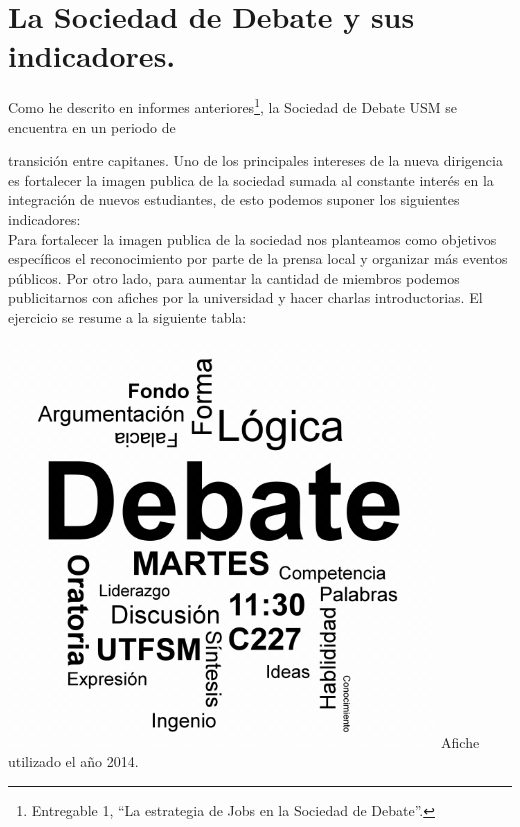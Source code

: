 \documentclass[spanish, fleqn]{article}
\begin{document}
	\section{La Sociedad de Debate y sus indicadores.}
	Como he descrito en informes anteriores\footnote{Entregable 1, ``La estrategia
	de Jobs en la Sociedad de Debate''.}, la Sociedad de Debate USM se encuentra 
	en un periodo de\\
	\begin{minipage}{0.75\textwidth}
	transición entre capitanes. Uno de los principales
	intereses de la nueva dirigencia es fortalecer la imagen publica de la sociedad
	sumada al constante interés en la integración de nuevos estudiantes, de esto
	podemos suponer los siguientes indicadores:\\
	Para fortalecer la imagen publica de la sociedad nos planteamos como objetivos
	específicos el reconocimiento por parte de la prensa local y organizar  más
	eventos públicos. Por otro lado, para aumentar la cantidad de miembros 
	podemos publicitarnos con afiches por la universidad y hacer charlas
	introductorias. El ejercicio se resume a la siguiente tabla:
	\end{minipage}
	\hfill
	\begin{minipage}{0.25\textwidth}
    	\begin{center}
    	    \includegraphics[width=0.85\textwidth]{new_afiche.png}
	    	Afiche utilizado el año 2014\cite{img}.
		\end{center}
	\end{minipage}
\end{document}
